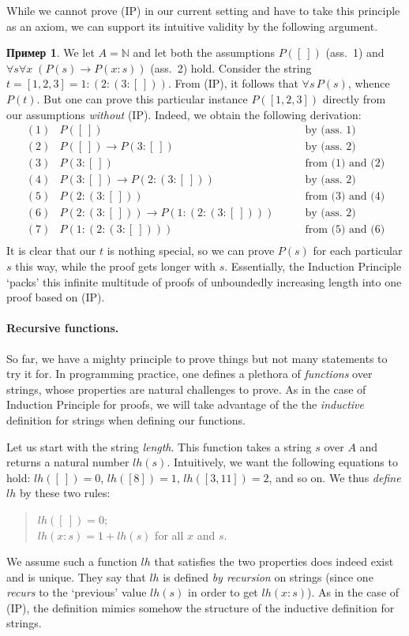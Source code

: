 \documentclass[12pt,notitlepage]{article}
\theoremstyle{plain}
\theoremstyle{definition}
\newtheorem{exm}[thm]{Пример}
\theoremstyle{plain}
\newcommand{\N}{\mathbb{N}}
\newcommand{\1}{\mathbf{1}}
\newcommand{\0}{\mathbf{0}}
\begin{document}
While we cannot prove (IP) in our current setting and have to take this principle as an axiom, we can support its intuitive validity by the following argument.
\begin{exm}\label{strings:ind_intuition}
	We let $A = \N$ and let both the assumptions $P([\ ])$ (ass.~1) and  $\forall s \forall x\; (P(s) \to P(x:s))$ (ass.~2) hold. Consider the string $t = [1,2,3] = 1 : (2 : (3 : [\ ]))$. From (IP), it follows that $\forall s\, P(s)$, whence $P(t)$. But one can prove this particular instance $P([1,2,3])$ directly from our assumptions \emph{without} (IP). Indeed, we obtain the following derivation:
	$$
	\begin{array}{rll}
		(1)&P([\ ])&\qquad\mbox{by (ass.~1)}\\
		(2)&P([\ ]) \to P(3 : [\ ])&\qquad\mbox{by (ass.~2)}\\
		(3)&P(3 : [\ ])&\qquad\mbox{from (1) and (2)}\\
		(4)&P(3 : [\ ]) \to P(2 : (3 : [\ ]))&\qquad\mbox{by (ass.~2)}\\
		(5)&P(2 : (3 : [\ ]))&\qquad\mbox{from (3) and (4)}\\
		(6)&P(2 : (3 : [\ ])) \to P(1 : (2 : (3 : [\ ])))&\qquad\mbox{by (ass.~2)}\\
		(7)&P(1 : (2 : (3 : [\ ])))&\qquad\mbox{from (5) and (6)}\\
	\end{array}
	$$
	It is clear that our $t$ is nothing special, so we can prove $P(s)$ for each particular $s$ this way, while the proof gets longer with $s$. Essentially, the Induction Principle `packs' this infinite multitude of proofs of unboundedly increasing length into one proof based on (IP).
\end{exm} 

\paragraph{Recursive functions.} So far, we have a mighty principle to prove things but not many statements to try it for. In programming practice, one defines a plethora of \emph{functions} over strings, whose properties are natural challenges to prove. As in the case of Induction Principle for proofs, we will take advantage of the the \emph{inductive} definition for strings when defining our functions.

Let us start with the string \emph{length}. This function takes a string $s$ over $A$ and returns a natural number $lh(s)$. Intuitively, we want the following equations to hold: $lh([\ ]) = 0$, $lh([8]) = 1$, $lh([3,11]) = 2$, and so on. We thus \emph{define} $lh$ by these two rules:
\begin{quote}
	$lh([\ ]) = 0$;\\
	$lh(x : s) = 1 + lh(s)$ for all $x$ and $s$.
\end{quote}
We assume such a function $lh$ that satisfies the two properties does indeed exist and is unique. They say that $lh$ is defined \emph{by recursion} on strings (since one \emph{recurs} to the `previous' value $lh(s)$ in order to get $lh(x: s)$). As in the case of (IP), the definition mimics somehow the structure of the inductive definition for strings.
\end{document}
